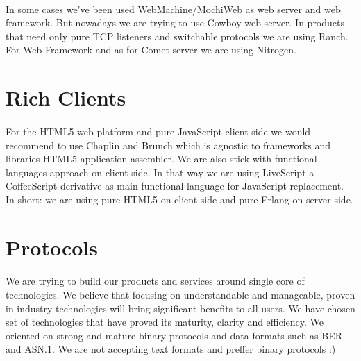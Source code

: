 \documentclass[11pt]{article}
\begin{document}
\paragraph{}
    In some cases we've been used WebMachine/MochiWeb as web server and web framework.
    But nowadays we are trying to use Cowboy web server. 
    In products that need only pure TCP listeners and switchable protocols we are using Ranch. 
    For Web Framework and as for Comet server we are using Nitrogen.

\section*{Rich Clients}
\paragraph{}
    For the HTML5 web platform and pure JavaScript client-side we would recommend to use
    Chaplin and Brunch which is agnostic to frameworks and libraries HTML5 application assembler.
    We are also stick with functional languages approach on client side.
    In that way we are using LiveScript a CoffeeScript derivative as main functional language for JavaScript replacement.
    In short: we are using pure HTML5 on client side and pure Erlang on server side.

\section*{Protocols}
\paragraph{}
    We are trying to build our products
    and services around single core of technologies. We believe that focusing on understandable
    and manageable, proven in industry technologies will bring significant benefits to all users.
    We have chosen set of technologies that have proved its maturity, clarity and efficiency.
    We oriented on strong and mature binary protocols and data formats such as BER and ASN.1.
    We are not accepting text formats and preffer binary protocols :)





\end{document}
